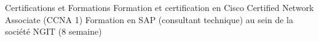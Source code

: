 \begin{rubric}{Certifications et Formations}
\entry*[]	 Formation et certification en Cisco Certified Network Associate (CCNA 1)
%
\entry*[]	 Formation en SAP (consultant technique) au sein de la société NGIT (8 semaine)
\end{rubric}

